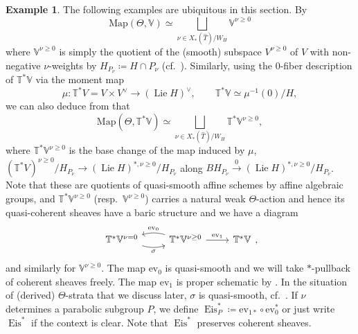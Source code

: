 \documentclass{amsart}
\theoremstyle{definition}
\newtheorem{example}[theorem]{Example}
\theoremstyle{remark}
\numberwithin{equation}{section}
\DeclareMathOperator{\Lie}{Lie}
\newcommand{\wh}{\widehat}
\DeclareMathOperator{\Eis}{\mathrm{Eis}}
\newcommand{\V}{\mathbb{V}}
\newcommand{\T}{\mathbb{T}}
\newcommand{\Map}{\mathrm{Map}}
\newcommand{\ev}{\mathrm{ev}}
\begin{document}
\begin{example}{\label{ex: TVnugeq0}}
   The following examples are ubiquitous in this section. By \cite[Theorem 1.4.8]{HLInstability}
    \begin{equation*}
       \Map(\Theta, \V) \simeq \bigsqcup\limits_{\nu \in X_{\ast}(\wh T)/ W_H} \V^{\nu \geq 0}    \end{equation*}
    where $\V^{\nu \geq 0}$ is simply the quotient of the (smooth) subspace $V^{\nu \geq 0}$ of $V$ with non-negative $\nu$-weights by $H_{P_\nu}\coloneq H\cap P_\nu$ (cf.~\cite[Propositions 1.4.1, 1.4.5]{HLInstability}). Similarly, using the 0-fiber description of $\T^*\V$ via the moment map
    \[
    \mu\colon \T^* V=V\times V^\vee \to (\Lie H)^\vee, \qquad \T^*\V\simeq \mu^{-1}(0)/H,
    \]
    we can also deduce from \cite[Theorem 1.4.8]{HLInstability} that 
    \begin{equation*}
\Map(\Theta, \T^{\ast}\V) \simeq \bigsqcup\limits_{\nu \in X_{\ast}(\wh T)/ W_H} \T^{\ast}\V^{\nu \geq 0}, 
    \end{equation*}
    where $\T^{\ast}\V^{\nu \geq 0}$ is the base change of the map induced by $\mu$, $(\T^*V)^{\nu \geq 0}/H_{P_\nu}\to (\Lie H)^{*, \nu \geq 0}/H_{P_\nu}$ along $BH_{P_\nu}\xrightarrow{0} (\Lie H)^{*, \nu \geq 0}/H_{P_\nu}$. Note that these are quotients of quasi-smooth affine schemes by affine algebraic groups, and $\T^{\ast}\V^{\nu \geq 0}$ (resp.~$\V^{\nu \geq 0}$) carries a natural weak $\Theta$-action and hence its quasi-coherent sheaves have a baric structure and we have a diagram
    \begin{equation*}
        \begin{tikzcd}
\T^{\ast}\V^{\nu = 0} \arrow[r, swap, bend right=15, "{\sigma}"] & \T^{\ast}\V^{\nu \geq 0} \arrow[l,swap, bend right=15, "{\ev_0}"] \arrow[r, "\ev_1"]& \T^{\ast}\V
        \end{tikzcd},
    \end{equation*}
    and similarly for $\V^{\nu \geq 0}$. The map $\ev_0$ is quasi-smooth and we will take $*$-pullback of coherent sheaves freely. The map $\ev_1$ is proper schematic by \cite[Lemma 5.1.7]{HLInstability}. In the situation of (derived) $\Theta$-strata that we discuss later, $\sigma$ is quasi-smooth, cf.~\cite[Lemma 3.2.7, Example 3.3.2]{HalpernLeistner}. If $\nu$ determines a parabolic subgroup $P$, we define $\Eis^*_P\coloneq \ev_{1*}\circ\ev_0^*$ or just write $\Eis^*$ if the context is clear. Note that $\Eis^*$ preserves coherent sheaves.  


\end{example}
\end{document}
